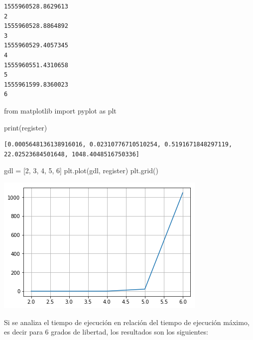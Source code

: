 \documentclass[
]{article}
\newenvironment{Shaded}{}{}
\newcommand{\BuiltInTok}[1]{#1}
\newcommand{\DecValTok}[1]{\textcolor[rgb]{0.25,0.63,0.44}{#1}}
\newcommand{\ImportTok}[1]{#1}
\newcommand{\NormalTok}[1]{#1}
\newcommand{\OperatorTok}[1]{\textcolor[rgb]{0.40,0.40,0.40}{#1}}
\begin{document}
\begin{verbatim}
1555960528.8629613
2
1555960528.8864892
3
1555960529.4057345
4
1555960551.4310658
5
1555961599.8360023
6
\end{verbatim}

\begin{Shaded}
\begin{Highlighting}[]
\ImportTok{from}\NormalTok{ matplotlib }\ImportTok{import}\NormalTok{ pyplot }\ImportTok{as}\NormalTok{ plt}
\end{Highlighting}
\end{Shaded}

\begin{Shaded}
\begin{Highlighting}[]
\BuiltInTok{print}\NormalTok{(register)}
\end{Highlighting}
\end{Shaded}

\begin{verbatim}
[0.0005648136138916016, 0.02310776710510254, 0.5191671848297119, 22.02523684501648, 1048.4048516750336]
\end{verbatim}

\begin{Shaded}
\begin{Highlighting}[]
\NormalTok{gdl }\OperatorTok{=}\NormalTok{ [}\DecValTok{2}\NormalTok{, }\DecValTok{3}\NormalTok{, }\DecValTok{4}\NormalTok{, }\DecValTok{5}\NormalTok{, }\DecValTok{6}\NormalTok{]}
\NormalTok{plt.plot(gdl, register)}
\NormalTok{plt.grid()}
\end{Highlighting}
\end{Shaded}

\includegraphics{output_11_0.png}

Si se analiza el tiempo de ejecución en relación del tiempo de ejecución
máximo, es decir para 6 grados de libertad, los resultados son los
siguientes:
\end{document}
